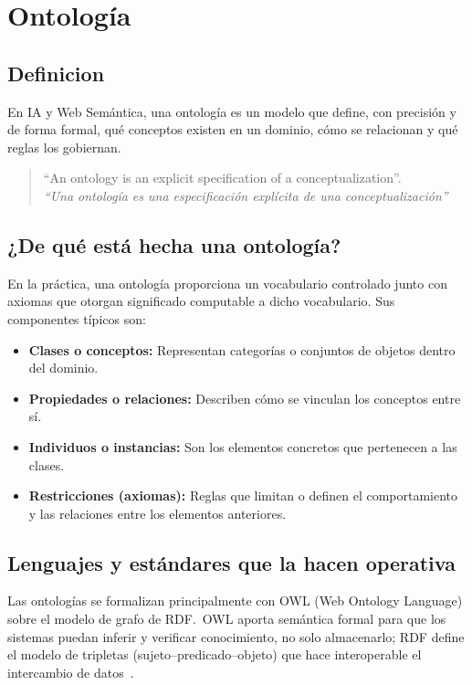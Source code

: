 \section{Ontología}

\subsection{Definicion}

En IA y Web Semántica, una ontología es un modelo que define, con precisión y de forma formal, qué conceptos existen en un dominio, cómo se relacionan y qué reglas los gobiernan.  

\begin{quote}
    “An ontology is an explicit specification of a conceptualization”.\\
    \textit{“Una ontología es una especificación explícita de una conceptualización” }\\
    \hfill\cite{Gruber2009Ontology}
\end{quote}

\subsection{¿De qué está hecha una ontología?}

En la práctica, una ontología proporciona un vocabulario controlado junto con axiomas que otorgan significado computable a dicho vocabulario. Sus componentes típicos son:

\begin{itemize}
    \item \textbf{Clases o conceptos:} Representan categorías o conjuntos de objetos dentro del dominio.
    \item \textbf{Propiedades o relaciones:} Describen cómo se vinculan los conceptos entre sí.
    \item \textbf{Individuos o instancias:} Son los elementos concretos que pertenecen a las clases.
    \item \textbf{Restricciones (axiomas):} Reglas que limitan o definen el comportamiento y las relaciones entre los elementos anteriores.
\end{itemize}

\subsection{Lenguajes y estándares que la hacen operativa}

Las ontologías se formalizan principalmente con OWL (Web Ontology Language) sobre el modelo de grafo de RDF.~OWL aporta semántica formal para que los sistemas puedan inferir y verificar conocimiento, no solo almacenarlo; RDF define el modelo de tripletas (sujeto--predicado--objeto) que hace interoperable el intercambio de datos~\parencite{W3C2012OWL2Overview}.

